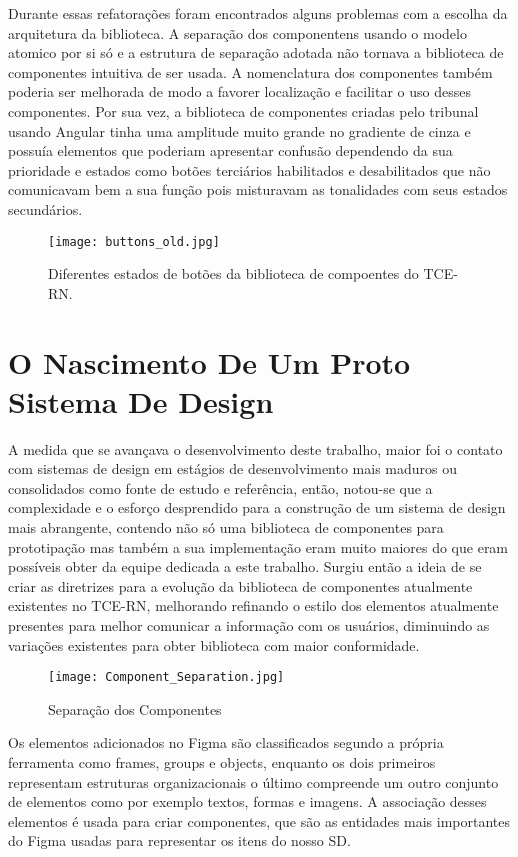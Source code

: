 Durante essas refatorações foram encontrados alguns problemas com a escolha da arquitetura da biblioteca. A separação dos componentens usando o modelo atomico por si só e a estrutura de separação adotada não tornava a biblioteca de componentes intuitiva de ser usada. A nomenclatura dos componentes também poderia ser melhorada de modo a favorer localização e facilitar o uso desses componentes.
Por sua vez, a biblioteca de componentes criadas pelo tribunal usando Angular tinha uma amplitude muito grande no gradiente de cinza e possuía elementos que poderiam apresentar confusão dependendo da sua prioridade e estados como botões terciários habilitados e desabilitados que não comunicavam bem a sua função pois misturavam as tonalidades com seus estados secundários.

\begin{figure}[h!]
	\texttt{[image: buttons\_old.jpg]}
	\caption{Diferentes estados de botões da biblioteca de compoentes do TCE-RN.}
	\label{fig:buttons_old}
\end{figure}

\section{O Nascimento De Um Proto Sistema De Design} \label{secao34}

A medida que se avançava o desenvolvimento deste trabalho, maior foi o contato com sistemas de design em estágios de desenvolvimento mais maduros ou consolidados como fonte de estudo e referência, então, notou-se que a complexidade e o esforço desprendido para a construção de um sistema de design mais abrangente, contendo não só uma biblioteca de componentes para prototipação mas também a sua implementação eram muito maiores do que eram possíveis obter da equipe dedicada a este trabalho. Surgiu então a ideia de se criar as diretrizes para a evolução da biblioteca de componentes atualmente existentes no TCE-RN, melhorando refinando o estilo dos elementos atualmente presentes para melhor comunicar a informação com os usuários, diminuindo as variações existentes para obter biblioteca com maior conformidade.


\begin{wrapfigure}{l}{0.5\textwidth}
	\texttt{[image: Component\_Separation.jpg]}
	\caption{Separação dos Componentes }
	\label{fig:wrapfig}
\end{wrapfigure}

Os elementos adicionados no Figma são classificados segundo a própria ferramenta como frames, groups e objects, enquanto os dois primeiros representam estruturas organizacionais o último compreende um outro conjunto de elementos como por exemplo textos, formas e imagens. A associação desses elementos é usada para criar componentes, que são as entidades mais importantes do Figma usadas para representar os itens do nosso SD.

